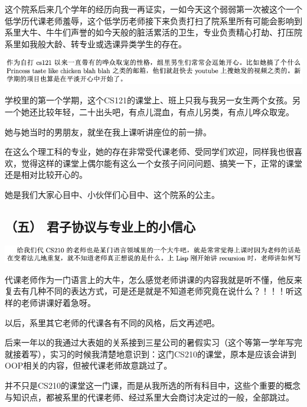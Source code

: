 \documentclass[9pt, b5paper]{article}
\begin{document}
这个院系后来几个学年的经历向我一再证实，一如今天这个弱弱第一次被这个一个低学历代课老师羞辱，这个低学历老师接下来负责打扫了院系里所有可能会影响到系里大牛、牛牛们声誉的如今天般的脏活累活的卫生，专业负责精心打劫、打压院系里如我般大龄、转专业或选课异类学生的存在。


\begin{center}
\includegraphics[width=.9\linewidth]{./pic/backups_plans_20210424_160112.png}
\end{center}

学校里的第一个学期，这个CS121的课堂上、班上只我与我另一女生两个女孩。另一个她还比较年轻，二十出头吧，有点儿混血，有点儿另类，有点儿哗众取宠。

她与她当时的男朋友，就坐在我上课听讲座位的前一排。

在这么个理工科的专业，她的存在非常受代课老师、受同学们欢迎，同样我也很喜欢，觉得这样的课堂上偶尔能有这么一个女孩子问问问题、搞笑一下，正常的课堂还是相对比较开心的。 

她是我们大家心目中、小伙伴们心目中、这个院系的公主。 

\subsection{（五） 君子协议与专业上的小信心}
\label{sec:org6f1f187}

\begin{center}
\includegraphics[width=.9\linewidth]{./pic/backups_plans_20210424_203858.png}
\end{center}

代课老师作为一门语言上的大牛，怎么感觉老师讲课的内容我就是听不懂，他反来复去有几种不同的表达方式，可是还是就是不知道老师究竟在说什么？！！！听这样的老师讲课好着急呀。 

以后，系里其它老师的代课各有不同的风格，后文再述吧。 

后来一年以的我通过大表姐的关系接到三星公司的暑假实习（这个等第一学年写完就接着写），实习的时候我清楚地意识到：这门CS210的课堂，原本是应该会讲到OOP相关的内容，但被代课老师故意跳过了。

并不只是CS210的课堂这一门课，而是从我所选的所有科目中，这些个重要的概念与知识点，都被系里的代课老师、经过系里大会商讨决定过的一般，全部跳过。
\end{document}
